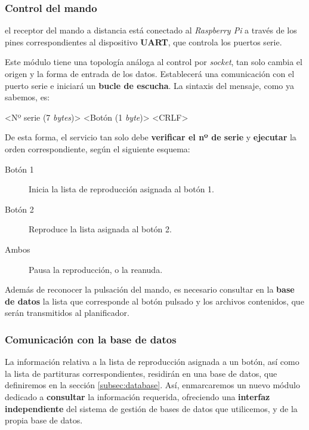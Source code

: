 \documentclass[10pt,a4paper]{article}
\begin{document}
	\subsubsection*{Control del mando}
	
	el receptor del mando a distancia está conectado al \textit{Raspberry Pi} a través de los pines correspondientes al dispositivo \textbf{UART}, que controla los puertos serie.
	
	Este módulo tiene una topología análoga al control por \textit{socket}, tan solo cambia el origen y la forma de entrada de los datos. Establecerá una comunicación con el puerto serie e iniciará un \textbf{bucle de escucha}. La sintaxis del mensaje, como ya sabemos, es:
	
	\begin{center}
		<Nº serie (7 \textit{bytes})> <Botón (1 \textit{byte})> <CRLF>
	\end{center}
	
	De esta forma, el servicio tan solo debe \textbf{verificar el nº de serie} y \textbf{ejecutar} la orden correspondiente, según el siguiente esquema:
	
	\begin{description}
		\item[Botón 1] Inicia la lista de reproducción asignada al botón 1.
		\item[Botón 2] Reproduce la lista asignada al botón 2.
		\item[Ambos] Pausa la reproducción, o la reanuda.
	\end{description}
	
	Además de reconocer la pulsación del mando, es necesario consultar en la \textbf{base de datos} la lista que corresponde al botón pulsado y los archivos contenidos, que serán transmitidos al planificador.
	
	\subsubsection*{Comunicación con la base de datos}
	
	La información relativa a la lista de reproducción asignada a un botón, así como la lista de partituras correspondientes, residirán en una base de datos, que definiremos en la sección \ref{subsec:database}. Así, enmarcaremos un nuevo módulo dedicado a \textbf{consultar} la información requerida, ofreciendo una \textbf{interfaz independiente} del sistema de gestión de bases de datos que utilicemos, y de la propia base de datos.
	
\end{document}

